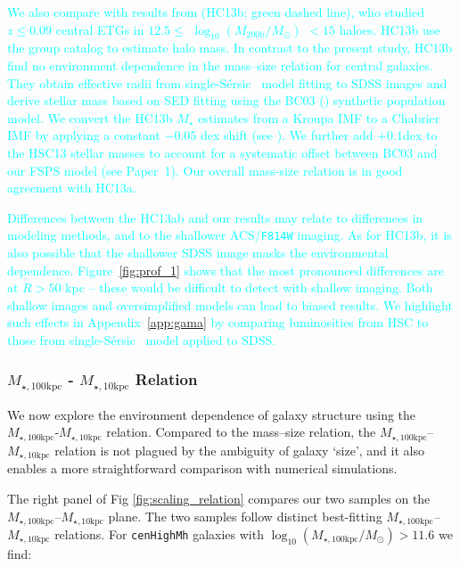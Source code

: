 \documentclass[a4paper,fleqn,usenatbib]{mnras}
\def\ser{{S\'{e}rsic\ }}
\def\rbcg{\texttt{cenHighMh}}
\def\mstar{{$M_{\star}$}}
\def\logmh{{$\log_{10} (M_{\mathrm{200b}}/M_{\odot})$}}
\def\minn{{$M_{\star,10\mathrm{kpc}}$}}
\def\mtot{{$M_{\star,100\mathrm{kpc}}$}}
\def\logmtot{{$\log_{10} (M_{\star,100\mathrm{kpc}}/M_{\odot})$}}
\newcommand{\song}[1]{\textcolor{cyan}{#1}}
\begin{document}
    \song{
    We also compare with results from \citealt{HCompany13} (HC13b; green dashed line), 
    who studied $z\leq 0.09$ central ETGs in $12.5 \le$ \logmh{} $< 15$ haloes. 
    HC13b use the \citet{Yang2007} group catalog to estimate halo mass. 
    In contrast to the present study, HC13b find no environment dependence in the 
    mass--size relation for central galaxies. 
    They obtain effective radii from single-\ser{} model fitting to SDSS 
    images and derive stellar mass based on SED fitting using the BC03 (\citealt{BC03}) 
    synthetic population model. 
    We convert the HC13b \mstar{} estimates from a Kroupa IMF to a Chabrier 
    IMF by applying a constant $-0.05$ dex shift (see \citealt{Bernardi2016a}). 
    We further add $+0.1$dex to the HSC13 stellar masses to account for a systematic 
    offset between BC03 and our FSPS model (see Paper~1). Our overall mass-size relation 
    is in good agreement with HC13a.
    }
    
    \song{
    Differences between the HC13ab and our results may relate to differences 
    in modeling methods, and to the shallower ACS/\texttt{F814W} imaging. 
    As for HC13b, it is also possible that the shallower SDSS image masks the 
    environmental dependence. 
    Figure~\ref{fig:prof_1} shows that the most pronounced differences are at 
    $R>50$ kpc -- these would be difficult to detect with shallow imaging. 
    Both shallow images and oversimplified models can lead to biased results. 
    We highlight such effects in Appendix~\ref{app:gama} by comparing luminosities 
    from HSC to those from single-\ser{} model applied to SDSS.
    }

    
\subsubsection{\mtot{} - \minn{} Relation}
    \label{sssec:m100_m10}
    
    We now explore the environment dependence of galaxy structure using the 
    \mtot{}-\minn{} relation.
    Compared to the mass--size relation, the \mtot{}--\minn{} relation is not plagued 
    by the ambiguity of galaxy `size', and it also enables a more straightforward 
    comparison with numerical simulations.
    
    The right panel of Fig \ref{fig:scaling_relation} compares our two samples on the 
    \mtot{}--\minn{} plane. 
    The two samples follow distinct best-fitting \mtot{}--\minn{} relations. 
    For \rbcg{} galaxies with \logmtot{}$>11.6$ we find:
    
\end{document}
